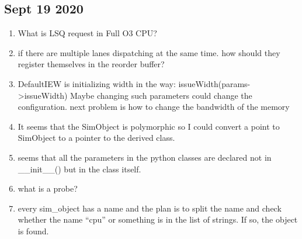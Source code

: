 \documentclass[11pt]{article}
\begin{document}
\subsection{Sept 19 2020}
\begin{enumerate}
  \item What is LSQ request in Full O3 CPU?
  \item if there are multiple lanes dispatching at the same time. how should they register themselves in the reorder buffer?
  \item DefaultIEW is initializing width in the way: issueWidth(params-\textgreater issueWidth) Maybe changing such parameters could change the configuration. next problem is how to change the bandwidth of the memory
  \item It seems that the SimObject is polymorphic so I could convert a point to SimObject to a pointer to the derived class.
  \item seems that all the parameters in the python classes are declared not in \_\_init\_\_() but in the class itself.
  \item what is a probe?
  \item every sim\_object has a name and the plan is to split the name and check whether the name ``cpu'' or something is in the list of strings. If so, the object is found.\\
\end{enumerate}
\end{document}
